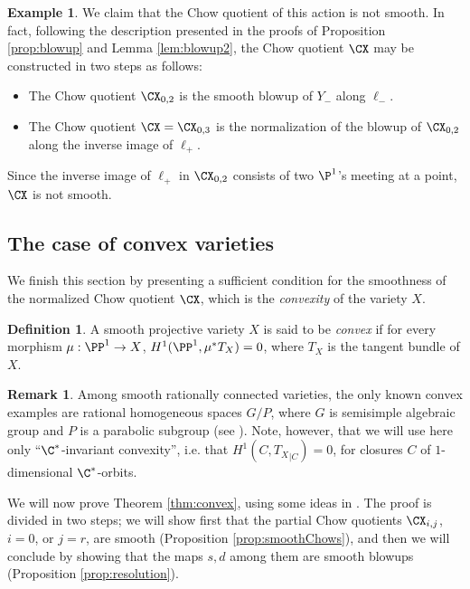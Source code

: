 \documentclass[reqno]{amsproc}
\theoremstyle{definition}
\newtheorem{definition}[theorem]{Definition}
\newtheorem{remark}[theorem]{Remark}
\newtheorem{example}[theorem]{Example}
\begin{document}
\begin{example}
We claim that the Chow quotient of this action is not smooth. 
In fact, following the description presented in the proofs of Proposition \ref{prop:blowup} and Lemma \ref{lem:blowup2}, the Chow quotient $\CX$ may be constructed in two steps  as follows:
\begin{itemize}
\item The Chow quotient $\CX_{0,2}$ is the smooth blowup of $Y_-$ along $\ell_-$. 
\item The Chow quotient $\CX=\CX_{0,3}$ is the normalization of the blowup of $\CX_{0,2}$ along the inverse image of $\ell_+$. 
\end{itemize}
Since the inverse image of $\ell_+$ in $\CX_{0,2}$ consists of two $\P^1$'s meeting at a point, $\CX$ is not smooth.
\end{example}

\subsection{The case of convex varieties}\label{ssec:convex}

We finish this section by presenting a sufficient condition for the smoothness of the normalized Chow quotient $\CX$,  
which is the {\em convexity} of the variety $X$.

\begin{definition}\cite[0.4]{FP}
A smooth projective variety $X$ is said to be {\em convex} if for every morphism $\mu: \PP^1 \to X$, $H^1(\PP^1,\mu^*T_X)=0$, where $T_X$ is the tangent bundle of $X$.
\end{definition}

\begin{remark}\label{rem:convorbits}
Among smooth rationally connected varieties, the only known convex examples are rational homogeneous spaces $G/P$, where $G$ is semisimple algebraic group and $P$ is a parabolic subgroup (see \cite{Pandharipande}). Note, however, that we will use here only ``$\C^*$-invariant convexity'', i.e. that $H^1(C,{T_X}_{|C})=0$, for closures $C$ of $1$-dimensional $\C^*$-orbits.
\end{remark}

We will now prove Theorem \ref{thm:convex}, using some ideas in \cite{FP,MMW}. The proof is divided in two steps; we will show first that the partial Chow quotients $\CX_{i,j}$, $i=0$, or $j=r$, are smooth (Proposition \ref{prop:smoothChows}), and then we will conclude by showing that the maps $s,d$ among them are smooth blowups (Proposition \ref{prop:resolution}).
\end{document}
